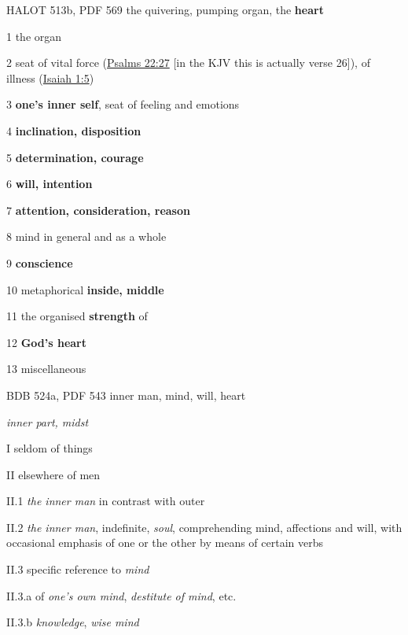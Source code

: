 				\begin{compactdesc}
					\item[HALOT 513b, PDF 569] the quivering, pumping organ, the \textbf{heart} %
						\begin{compactitem}
							\item[1] the organ
							\item[2] seat of vital force (\hyperref[PSALMS-22-26]{Psalms 22:27} [in the KJV this is actually verse 26]), of illness (\hyperref[ISAIAH-1-5]{Isaiah 1:5})
							\item[3] \textbf{one's inner self}, seat of feeling and emotions
							\item[4] \textbf{inclination, disposition}
							\item[5] \textbf{determination, courage}
							\item[6] \textbf{will, intention}
							\item[7] \textbf{attention, consideration, reason}
							\item[8] mind in general and as a whole
							\item[9] \textbf{conscience}
							\item[10] metaphorical \textbf{inside, middle}
							\item[11] the organised \textbf{strength} of 
							\item[12] \textbf{God's heart}
							\item[13] miscellaneous
						\end{compactitem}
					\item[BDB 524a, PDF 543] inner man, mind, will, heart
						\begin{compactitem}
							\item \textit{inner part, midst}
							\item[I] seldom of things
							\item[II] elsewhere of men
							\item[II.1] \textit{the inner man} in contrast with outer
							\item[II.2] \textit{the inner man}, indefinite, \textit{soul}, comprehending mind, affections and will, with occasional emphasis of one or the other by means of certain verbs
							\item[II.3] specific reference to \textit{mind}
							\item[II.3.a] of \textit{one's own mind}, \textit{destitute of mind}, etc.
							\item[II.3.b] \textit{knowledge}, \textit{wise mind}

\end{compactitem}
\end{compactdesc}
